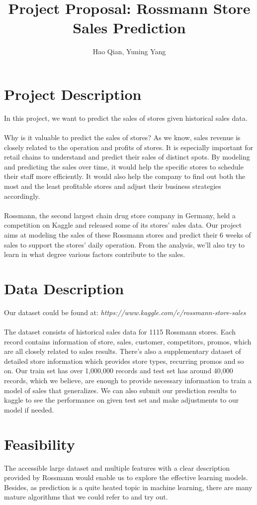 \documentclass[11pt]{article}
\title{Project Proposal: Rossmann Store Sales Prediction}
\author{Hao Qian, Yuning Yang}
\begin{document}
\maketitle
\section{Project Description}
In this project, we want to predict the sales of stores given historical sales data.\\\\
Why is it valuable to predict the sales of stores? As we know, sales revenue is closely related to the operation and profits of stores. It is especially important for retail chains to understand and predict their sales of distinct spots. By modeling and predicting the sales over time, it would help the specific stores to schedule their staff more efficiently. It would also help the company to find out both the most and the least profitable stores and adjust their business strategies accordingly. \\\\
Rossmann, the second largest chain drug store company in Germany, held a competition on Kaggle and released some of its stores' sales data. Our project aims at modeling the sales of these Rossmann stores and predict their 6 weeks of sales to support the stores’ daily operation. From the analysis, we'll also try to learn in what degree various factors contribute to the sales. 

\section{Data Description}
Our dataset could be found at: \emph{https://www.kaggle.com/c/rossmann-store-sales}\\\\
The dataset consists of historical sales data for 1115 Rossmann stores. Each record contains information of store, sales, customer, competitors, promos, which are all closely related to sales results. There's also a supplementary dataset of detailed store information which provides store types, recurring promos and so on. Our train set has over 1,000,000 records and test set has around 40,000 records, which we believe, are enough to provide necessary information to train a model of sales that generalizes. We can also submit our prediction results to kaggle to see the performance on given test set and make adjustments to our model if needed.
\section{Feasibility}
The accessible large dataset and multiple features with a clear description provided by Rossmann would enable us to explore the effective learning models. Besides, as prediction is a quite heated topic in machine learning, there are many mature algorithms that we could refer to and try out.
\end{document}

